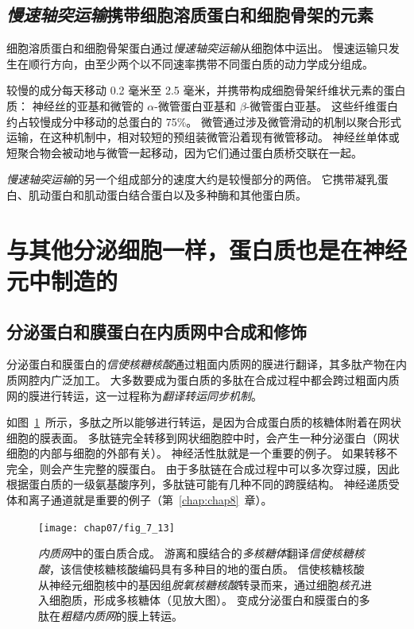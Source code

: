 \subsection{\textit{慢速轴突运输}携带细胞溶质蛋白和细胞骨架的元素}

细胞溶质蛋白和细胞骨架蛋白通过\textit{慢速轴突运输}从细胞体中运出。
慢速运输只发生在顺行方向，由至少两个以不同速率携带不同蛋白质的动力学成分组成。


较慢的成分每天移动 0.2 毫米至 2.5 毫米，并携带构成细胞骨架纤维状元素的蛋白质：
神经丝的亚基和微管的 $\alpha$-微管蛋白亚基和 $\beta$-微管蛋白亚基。
这些纤维蛋白约占较慢成分中移动的总蛋白的 75\%。 
微管通过涉及微管滑动的机制以聚合形式运输，在这种机制中，相对较短的预组装微管沿着现有微管移动。
神经丝单体或短聚合物会被动地与微管一起移动，因为它们通过蛋白质桥交联在一起。


\textit{慢速轴突运输}的另一个组成部分的速度大约是较慢部分的两倍。
它携带凝乳蛋白、肌动蛋白和肌动蛋白结合蛋白以及多种酶和其他蛋白质。



\section{与其他分泌细胞一样，蛋白质也是在神经元中制造的}

\subsection{分泌蛋白和膜蛋白在内质网中合成和修饰}

分泌蛋白和膜蛋白的\textit{信使核糖核酸}通过粗面内质网的膜进行翻译，其多肽产物在内质网腔内广泛加工。
大多数要成为蛋白质的多肽在合成过程中都会跨过粗面内质网的膜进行转运，这一过程称为\textit{翻译转运同步机制}。


如图~\ref{fig:7_13}~所示，多肽之所以能够进行转运，是因为合成蛋白质的核糖体附着在网状细胞的膜表面。
多肽链完全转移到网状细胞腔中时，会产生一种分泌蛋白（网状细胞的内部与细胞的外部有关）。
神经活性肽就是一个重要的例子。
如果转移不完全，则会产生完整的膜蛋白。
由于多肽链在合成过程中可以多次穿过膜，因此根据蛋白质的一级氨基酸序列，多肽链可能有几种不同的跨膜结构。
神经递质受体和离子通道就是重要的例子（第~\ref{chap:chap8}~章）。


\begin{figure}[htbp]
	\centering
	\texttt{[image: chap07/fig\_7\_13]}
	\caption{\textit{内质网}中的蛋白质合成。
		游离和膜结合的\textit{多核糖体}翻译\textit{信使核糖核酸}，该信使核糖核酸编码具有多种目的地的蛋白质。
		信使核糖核酸从神经元细胞核中的基因组\textit{脱氧核糖核酸}转录而来，通过细胞\textit{核孔}进入细胞质，形成多核糖体（见放大图）。
		变成分泌蛋白和膜蛋白的多肽在\textit{粗糙内质网}的膜上转运。}
	\label{fig:7_13}
\end{figure}


